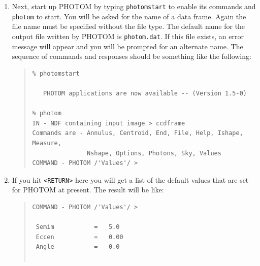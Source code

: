 \documentclass[twoside,11pt]{article}
\newcommand{\xref}[3]{#1}
\begin{document}
\begin{enumerate}
   \xref{{\tt lutneg}}{sun95}{LUTNEG} sets up a negative grey-scale colour
   table\footnote{An image displayed with the {\tt lutneg} colour table
   mimics the appearance of a conventional astronomical photographic plate:
   stars appear as dark spots on a light background.  Various other colour
   tables are available in KAPPA.  For example, {\tt lutgrey} sets up a
   positive grey-scale (light stars against a dark background) and
   {\tt lutheat} sets up a pseudo-heat sequence.}.  {\tt display} displays
   the image, which should appear as a grey-scale plot.  Note that the
   input file name is (and must be) specified without the `{\tt .sdf}'
   file type.

  \item Next, start up PHOTOM by typing {\tt photomstart} to enable its
   commands and \xref{{\tt photom}}{sun45}{PHOTOM} to start.  You will be
   asked for the name of a data frame.  Again the file name must be
   specified without the file type.  The default name for the output file
   written by PHOTOM is {\tt photom.dat}.  If this file exists, an error
   message will appear and you will be prompted for an alternate name.
   The sequence of commands and responses should be something like the
   following:

{\samepage
\begin{quote}
\begin{small}
\begin{verbatim}
% photomstart

   PHOTOM applications are now available -- (Version 1.5-0)

% photom
IN - NDF containing input image > ccdframe
Commands are - Annulus, Centroid, End, File, Help, Ishape, Measure,
               Nshape, Options, Photons, Sky, Values
COMMAND - PHOTOM /'Values'/ >
\end{verbatim}
\end{small}
\end{quote}
}

  \item If you hit \verb+<RETURN>+ here you will get a list of the default
   values that are set for PHOTOM at present. The result will be like:

\begin{quote}
\begin{small}
\begin{verbatim}
COMMAND - PHOTOM /'Values'/ >

 Semim           =   5.0
 Eccen           =   0.00
 Angle           =   0.0


\end{verbatim}
\end{small}
\end{quote}
\end{enumerate}
\end{document}
